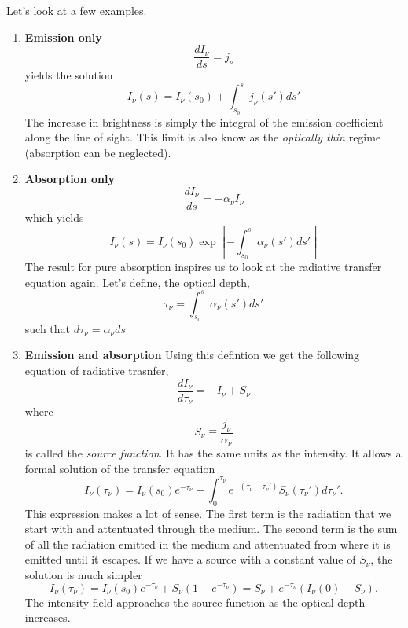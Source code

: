 Let's look at a few examples. 
\begin{enumerate}
\item {\bf Emission only}
\begin{equation}
\frac{d I_\nu}{ds} = j_\nu
\label{eq:57}
\end{equation}
yields the solution
\begin{equation}
I_\nu (s) = I_\nu(s_0) + \int_{s_0}^s j_\nu (s') ds'
\label{eq:58}
\end{equation}
The increase in brightness is simply the integral of the emission
coefficient along the line of sight.  This limit is also know as the
{\em optically thin} regime (absorption can be neglected).
\item {\bf Absorption only}
\begin{equation}
\frac{d I_\nu}{ds} = - \alpha_\nu I_\nu 
\label{eq:59}
\end{equation}
which yields
\begin{equation}
I_\nu (s) = I_\nu(s_0) \exp \left [ -\int_{s_0}^s \alpha_\nu (s') ds'
  \right ]
\label{eq:60}
\end{equation}
The result for pure absorption inspires us to look at the radiative
transfer equation again. Let's define, the optical depth,
\begin{equation}
\tau_\nu = \int_{s_0}^s \alpha_\nu (s') ds' 
\label{eq:61}
\end{equation}
such that $d\tau_\nu = \alpha_\nu ds$
\item {\bf Emission and absorption}
Using this defintion we get the following equation of radiative
trasnfer,
\begin{equation}
\frac{d I_\nu}{d\tau_\nu} = -I_\nu + S_\nu
\label{eq:62}
\end{equation}
where 
\begin{equation}
S_\nu \equiv \frac{j_\nu}{\alpha_\nu}
\label{eq:63}
\end{equation}
is called the {\em source function}.  It has the same units as the 
intensity.  It allows a formal solution of the transfer equation
\begin{equation} 
I_\nu (\tau_\nu) = I_\nu(s_0)e^{-\tau_\nu} + \int_0^{\tau_\nu}
e^{-(\tau_\nu - \tau_\nu')} S_\nu(\tau_\nu') d\tau_\nu'.
\label{eq:64}
\end{equation}
This expression makes a lot of sense.  The first term is the radiation
that we start with and attentuated through the medium.  The second
term is the sum of all the radiation emitted in the medium and
attentuated from where it is emitted until it escapes. If we have a
source with a constant value of $S_\nu$, the solution is much simpler
\begin{equation}
I_\nu (\tau_\nu) = I_\nu(s_0)e^{-\tau_\nu} + S_\nu \left ( 1 -
e^{-\tau_\nu} \right ) = S_\nu + e^{-\tau_\nu} \left ( I_\nu(0) - S_\nu
\right ).
\label{eq:65}
\end{equation}
The intensity field approaches the source function as the optical
depth increases.
\end{enumerate}

